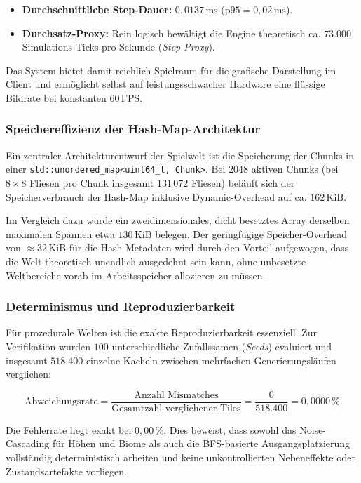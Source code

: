 \documentclass[
  a4paper,
  11pt,
  twoside,
  BCOR=8mm,           %
  headings=big,
  numbers=noenddot,
  listof=totoc,       %
  captions=tableheading,
]{scrreprt}
\begin{document}
\begin{itemize}
    \item \textbf{Durchschnittliche Step-Dauer:} $0{,}0137\,\text{ms}$ ($\text{p95} = 0{,}02\,\text{ms}$).
    \item \textbf{Durchsatz-Proxy:} Rein logisch bewältigt die Engine theoretisch ca. $73.000$ Simulations-Ticks pro Sekunde (\textit{Step Proxy}). 
\end{itemize}

Das System bietet damit reichlich Spielraum für die grafische Darstellung im Client und ermöglicht selbst auf leistungsschwacher Hardware eine flüssige Bildrate bei konstanten $60\,\text{FPS}$.

\subsubsection{Speichereffizienz der Hash-Map-Architektur}
Ein zentraler Architekturentwurf der Spielwelt ist die Speicherung der Chunks in einer \texttt{std::unordered\_map<uint64\_t, Chunk>}. Bei $2048$ aktiven Chunks (bei $8 \times 8$ Fliesen pro Chunk insgesamt $131\,072$ Fliesen) beläuft sich der Speicherverbrauch der Hash-Map inklusive Dynamic-Overhead auf ca. $162\,\text{KiB}$. 

Im Vergleich dazu würde ein zweidimensionales, dicht besetztes Array derselben maximalen Spannen etwa $130\,\text{KiB}$ belegen. Der geringfügige Speicher-Overhead von $\approx 32\,\text{KiB}$ für die Hash-Metadaten wird durch den Vorteil aufgewogen, dass die Welt theoretisch unendlich ausgedehnt sein kann, ohne unbesetzte Weltbereiche vorab im Arbeitsspeicher allozieren zu müssen.

\subsubsection{Determinismus und Reproduzierbarkeit}
Für prozedurale Welten ist die exakte Reproduzierbarkeit essenziell. Zur Verifikation wurden $100$ unterschiedliche Zufallssamen (\textit{Seeds}) evaluiert und insgesamt $518.400$ einzelne Kacheln zwischen mehrfachen Generierungsläufen verglichen:

$$\text{Abweichungsrate} = \frac{\text{Anzahl Mismatches}}{\text{Gesamtzahl verglichener Tiles}} = \frac{0}{518.400} = 0{,}0000\,\%$$

Die Fehlerrate liegt exakt bei $0{,}00\,\%$. Dies beweist, dass sowohl das Noise-Cascading für Höhen und Biome als auch die BFS-basierte Ausgangsplatzierung vollständig deterministisch arbeiten und keine unkontrollierten Nebeneffekte oder Zustandsartefakte vorliegen.
\end{document}
